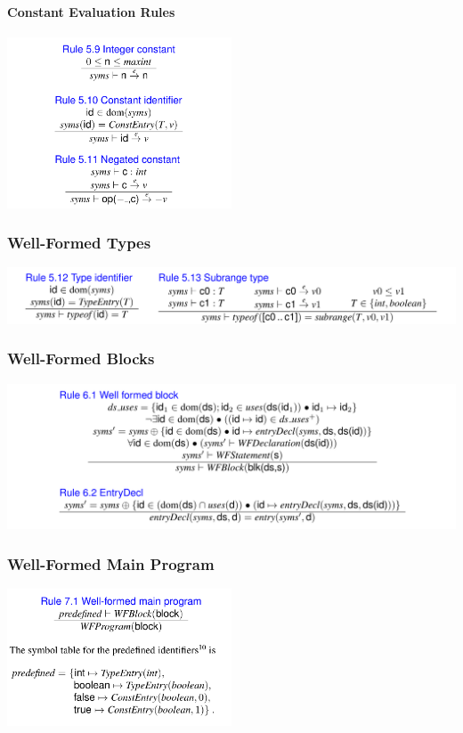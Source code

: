 \documentclass[10pt,a4paper,]{article}
\let\oldparagraph\paragraph
\renewcommand{\paragraph}[1]{\oldparagraph{#1}\mbox{}}
\begin{document}
\hypertarget{constant-evaluation-rules}{%
\paragraph{Constant Evaluation Rules}\label{constant-evaluation-rules}}

\includegraphics[width=0.5\textwidth]{assets/image-20200703200827441.png}

\hypertarget{well-formed-types}{%
\subsubsection{Well-Formed Types}\label{well-formed-types}}

\includegraphics{assets/image-20200703200904388.png}

\hypertarget{well-formed-blocks}{%
\subsubsection{Well-Formed Blocks}\label{well-formed-blocks}}

\includegraphics{assets/image-20200703200920326.png}

\hypertarget{well-formed-main-program}{%
\subsubsection{Well-Formed Main
Program}\label{well-formed-main-program}}

\includegraphics[width=0.5\textwidth]{assets/image-20200703200944338.png}
\end{document}
